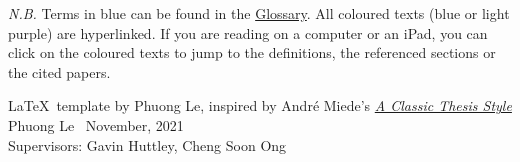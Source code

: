 \thispagestyle{empty}

\textit{N.B.} Terms in blue can be found in the \hyperref[glossary]{Glossary}. All coloured texts (blue or light purple) are hyperlinked. If you are reading on a computer or an iPad, you can click on the coloured texts to jump to the definitions, the referenced sections or the cited papers.

\vfill
\normalsize
\LaTeX\ template by 
Phuong Le, inspired by André Miede's \href{https://bitbucket.org/amiede/classicthesis/wiki/Home}{\textit{A Classic Thesis Style}} \\
Phuong Le \textcopyright\ November, 2021 \\
Supervisors: Gavin Huttley, Cheng Soon Ong

\newpage